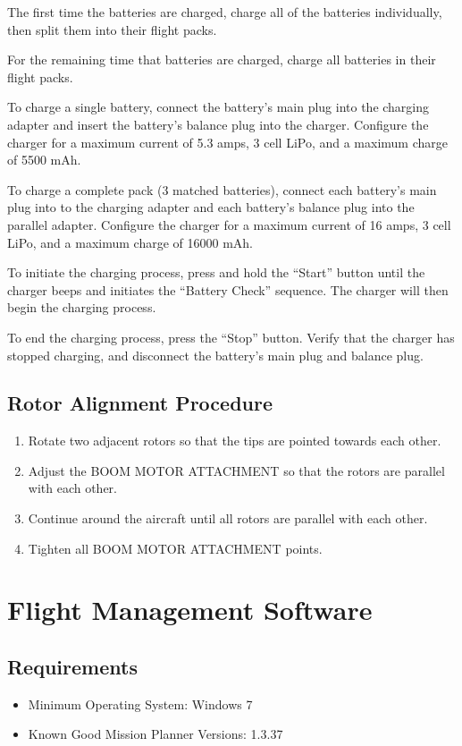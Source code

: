 \documentclass{report}
\begin{document}
		The first time the batteries are charged, charge all of the batteries individually, then split them into their flight packs.

		For the remaining time that batteries are charged, charge all batteries in their flight packs.

		To charge a single battery, connect the battery's main plug into the charging adapter and insert the battery's balance plug into the charger.  Configure the charger for a maximum current of 5.3 amps, 3 cell LiPo, and a maximum charge of 5500 mAh.

		To charge a complete pack (3 matched batteries), connect each battery's main plug into to the charging adapter and each battery's balance plug into the parallel adapter.  Configure the charger for a maximum current of 16 amps, 3 cell LiPo, and a maximum charge of 16000 mAh.

		To initiate the charging process, press and hold the ``Start'' button until the charger beeps and initiates the ``Battery Check'' sequence.  The charger will then begin the charging process.

		To end the charging process, press the ``Stop'' button.  Verify that the charger has stopped charging, and disconnect the battery's main plug and balance plug.
	\section{Rotor Alignment Procedure}
		\begin{enumerate}
			\item Rotate two adjacent rotors so that the tips are pointed towards each other.
			\item Adjust the BOOM MOTOR ATTACHMENT so that the rotors are parallel with each other.
			\item Continue around the aircraft until all rotors are parallel with each other.
			\item Tighten all BOOM MOTOR ATTACHMENT points.
		\end{enumerate}
\chapter{Flight Management Software}
	\section{Requirements}
		\begin{itemize}
			\item Minimum Operating System: Windows 7
			\item Known Good Mission Planner Versions: 1.3.37
		\end{itemize}
\end{document}
